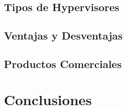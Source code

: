 \documentclass[%
 reprint,
 amsmath,amssymb,
 aps,
]{revtex4-1}
\begin{document}
\subsection{Tipos de Hypervisores}
\subsection{Ventajas y Desventajas}
\subsection{Productos Comerciales}

\section{Conclusiones}\label{sec:8}
\end{document}
